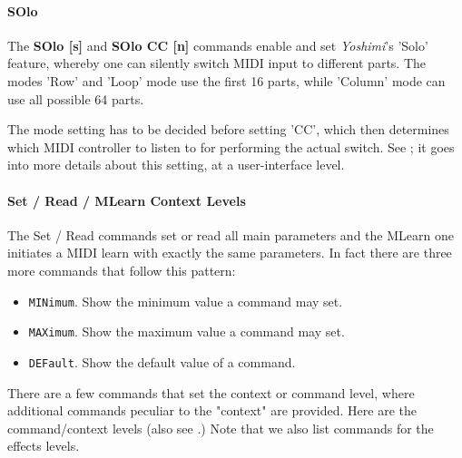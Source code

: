 \paragraph{SOlo}
\label{paragraph:command_line_solo}
   The \textbf{SOlo [s]} and \textbf{SOlo CC [n]}
   commands enable and set \textsl{Yoshimi}'s 'Solo' feature,
   whereby one can silently switch MIDI input to different parts.
   The modes 'Row' and 'Loop' mode use the first 16 parts, while
   'Column' mode can use all possible 64 parts.

   The mode setting has to be decided before setting 'CC', which then determines
   which MIDI controller to listen to for performing the actual switch.
   See ; it goes into more details about
   this setting, at a user-interface level.

\paragraph{Set / Read / MLearn Context Levels}
\label{paragraph:command_line_context_levels}

   The Set / Read commands set or read all main parameters and the MLearn one
   initiates a MIDI learn with exactly the same parameters.
   In fact there are three more commands that follow this pattern:

   \begin{itemize}
   \item \texttt{MINimum}. Show the minimum value a command may set.
   \item \texttt{MAXimum}. Show the maximum value a command may set.
   \item \texttt{DEFault}. Show the default value of a command.
   \end{itemize}

   There are a few commands that set the context or command level, where
   additional commands peculiar to the "context" are provided.  Here are the
   command/context levels
   (also see .)
   Note that we also list commands for the effects levels.

